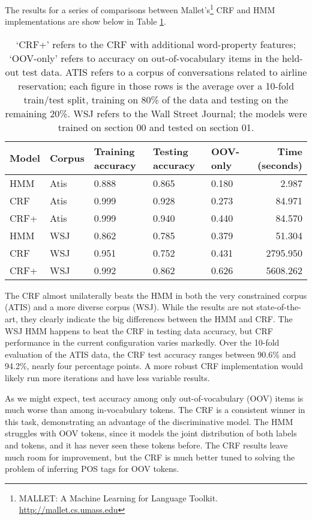 \documentclass[10pt]{article}\usepackage{graphicx, color}
\begin{document}
The results for a series of comparisons between Mallet's\footnote{MALLET: A Machine Learning for Language Toolkit. \url{http://mallet.cs.umass.edu}} CRF and HMM implementations are show below in Table \ref{table:1}.




\begin{table}[H]
  \centering
  \begin{tabular}{lllllr}
    Model & Corpus & Training accuracy & Testing accuracy & OOV-only & Time (seconds) \\
    \midrule
    HMM   & Atis & 0.888 & 0.865 &
      0.180 & 2.987 \\
    CRF   & Atis & 0.999 & 0.928 &
      0.273 & 84.971 \\
    CRF+ & Atis & 0.999 & 0.940 &
      0.440 & 84.570 \\
    \midrule
    HMM   & WSJ & 0.862 & 0.785 &
      0.379 & 51.304 \\
    CRF   & WSJ & 0.951 & 0.752 &
      0.431 & 2795.950 \\
    CRF+ & WSJ & 0.992 & 0.862 &
      0.626 & 5608.262 \\
  \end{tabular}
  \caption{`CRF+' refers to the CRF with additional word-property features; `OOV-only' refers to accuracy on out-of-vocabulary items in the held-out test data. ATIS refers to a corpus of conversations related to airline reservation; each figure in those rows is the average over a 10-fold train/test split, training on 80\% of the data and testing on the remaining 20\%. WSJ refers to the Wall Street Journal; the models were trained on section 00 and tested on section 01.}
  \label{table:1}
\end{table}
The CRF almost unilaterally beats the HMM in both the very constrained corpus (ATIS) and a more diverse corpus (WSJ). While the results are not state-of-the-art, they clearly indicate the big differences between the HMM and CRF.
The WSJ HMM happens to beat the CRF in testing data accuracy, but CRF performance in the current configuration varies markedly. Over the 10-fold evaluation of the ATIS data, the CRF test accuracy ranges between 90.6\% and 94.2\%, nearly four percentage points.
A more robust CRF implementation would likely run more iterations and have less variable results.

As we might expect, test accuracy among only out-of-vocabulary (OOV) items is much worse than among in-vocabulary tokens. The CRF is a consistent winner in this task, demonstrating an advantage of the discriminative model. The HMM struggles with OOV tokens, since it models the joint distribution of both labels and tokens, and it has never seen these tokens before. The CRF results leave much room for improvement, but the CRF is much better tuned to solving the problem of inferring POS tags for OOV tokens.
\end{document}
